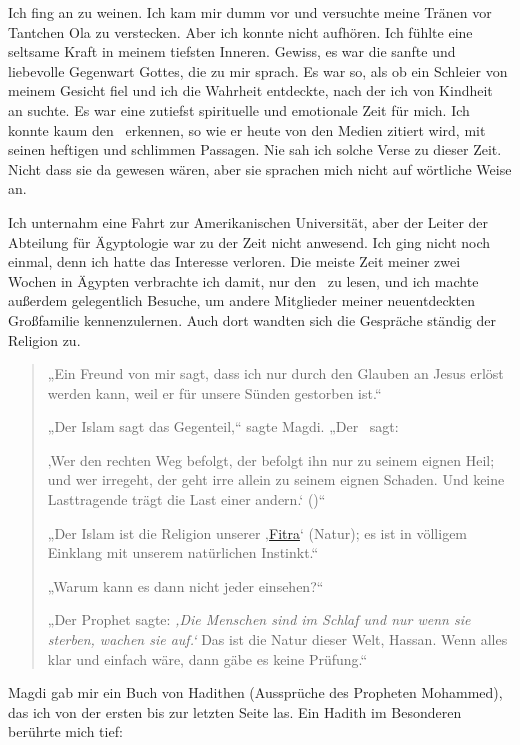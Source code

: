 \documentclass[12pt]{memoir}
\begin{document}
Ich fing an zu weinen.
Ich kam mir dumm vor und versuchte meine Tränen vor Tantchen Ola zu verstecken.
Aber ich konnte nicht aufhören.
Ich fühlte eine seltsame Kraft in meinem tiefsten Inneren.
Gewiss, es war die sanfte und liebevolle Gegenwart Gottes, die zu mir sprach.
Es war so, als ob ein Schleier von meinem Gesicht fiel
und ich die Wahrheit entdeckte, nach der ich von Kindheit an suchte.
Es war eine zutiefst spirituelle und emotionale Zeit für mich.
Ich konnte kaum den \Quran\ erkennen,
so wie er heute von den Medien zitiert wird,
mit seinen heftigen und schlimmen Passagen.
Nie sah ich solche Verse zu dieser Zeit.
Nicht dass sie da gewesen wären,
aber sie sprachen mich nicht auf wörtliche Weise an.

Ich unternahm eine Fahrt zur Amerikanischen Universität,
aber der Leiter der Abteilung für Ägyptologie war zu der Zeit nicht anwesend.
Ich ging nicht noch einmal, denn ich hatte das Interesse verloren.
Die meiste Zeit meiner zwei Wochen in Ägypten verbrachte ich damit,
nur den \Quran\ zu lesen, und ich machte außerdem gelegentlich Besuche,
um andere Mitglieder meiner neuentdeckten Großfamilie kennenzulernen.
Auch dort wandten sich die Gespräche ständig der Religion zu.

\begin{quote}
„Ein Freund von mir sagt,
dass ich nur durch den Glauben an Jesus erlöst werden kann,
weil er für unsere Sünden gestorben ist.“

„Der Islam sagt das Gegenteil,“ sagte Magdi. „Der \Quran\ sagt:

‚Wer den rechten Weg befolgt, der befolgt ihn nur zu seinem eignen Heil;
und wer irregeht, der geht irre allein zu seinem eignen Schaden.
Und keine Lasttragende trägt die Last einer andern.‘
()“

„Der Islam ist die Religion unserer
‚\href{http://de.wikipedia.org/wiki/Fitra}{Fitra}‘ (Natur);
es ist in völligem Einklang mit unserem natürlichen Instinkt.“

„Warum kann es dann nicht jeder einsehen?“

„Der Prophet sagte:
\emph{‚Die Menschen sind im Schlaf und nur wenn sie sterben, wachen sie auf.‘}
Das ist die Natur dieser Welt, Hassan.
Wenn alles klar und einfach wäre, dann gäbe es keine Prüfung.“
\end{quote}

Magdi gab mir ein Buch von Hadithen (Aussprüche des Propheten Mohammed),
das ich von der ersten bis zur letzten Seite las.
Ein Hadith im Besonderen berührte mich tief:
\end{document}
